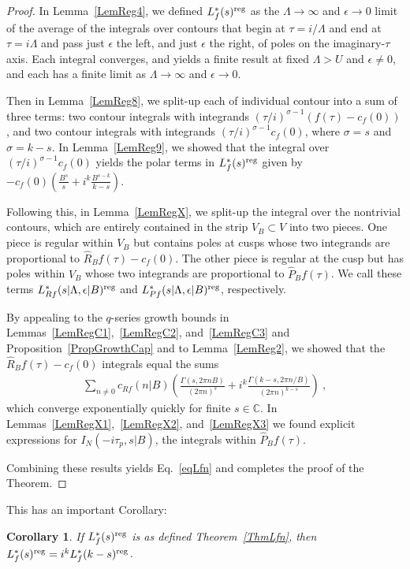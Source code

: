 \documentclass[11pt,a4paper]{article}
\newcommand{\e}{\epsilon}
\newcommand{\G}{\Gamma}
\newcommand{\La}{\Lambda}
\newtheorem{cor}[thm]{Corollary}
\def\C{\mathbb{C}}
\newcommand{\reg}{{\rm reg}}
\newcommand{\PF}{\widehat{P}} 				%
\newcommand{\RF}{\widehat{R}} 				%
\begin{document}
\begin{proof}
In Lemma~\ref{LemReg4}, we defined $L_f^*(s)^\reg$ as the $\La \to \infty$ and $\e \to 0$ limit of the average of the integrals over contours that begin at $\tau = i/\La$ and end at $\tau = i \La$ and pass just $\e$ the left, and just $\e$ the right, of poles on the imaginary-$\tau$ axis. Each integral converges, and yields a finite result at fixed $\La>U$ and $\e\neq 0$, and each has a finite limit as $\La \to \infty$ and $\e \to 0$.

Then in Lemma~\ref{LemReg8}, we split-up each of individual contour into a sum of three terms: two contour integrals with integrands $(\tau/i)^{\sigma-1}(f(\tau) -c_f(0))$, and two contour integrals with integrands $(\tau/i)^{\sigma -1} c_f(0)$, where $\sigma = s$ and $\sigma = k-s$. In Lemma~\ref{LemReg9}, we showed that the integral over $(\tau/i)^{\sigma -1} c_f(0)$ yields the polar terms in $L_f^*(s)^\reg$ given by $-c_f(0)(\tfrac{B^s}{s} + i^k \tfrac{B^{s-k}}{k-s})$. 

Following this, in Lemma~\ref{LemRegX}, we split-up the integral over the nontrivial contours, which are entirely contained in the strip $V_B \subset V$ into two pieces. One piece is regular within $V_B$ but contains poles at cusps whose two integrands are proportional to $\RF_B f(\tau) - c_f(0)$. The other piece is regular at the cusp but has poles within $V_B$ whose two integrands are proportional to  $\PF_B f(\tau)$. We call these terms $L_{Rf}^*(s|\La,\e|B)^\reg$ and $L_{Pf}^*(s|\La,\e|B)^\reg$, respectively.

By appealing to the $q$-series growth bounds in Lemmas~\ref{LemRegC1},~\ref{LemRegC2}, and~\ref{LemRegC3} and Proposition~\ref{PropGrowthCap} and to Lemma~\ref{LemReg2}, we showed that the $\RF_B f(\tau) - c_f(0)$ integrals equal the sums
\begin{align}
\sum_{n \neq 0} c_{Rf}(n|B) \left(\frac{\G(s,2\pi n B)}{(2\pi n)^s}+i^k \frac{\G(k-s,2\pi n /B)}{(2\pi n)^{k-s}}\right)~, 
\end{align}
which converge exponentially quickly for finite $s \in \C$. In Lemmas~\ref{LemRegX1},~\ref{LemRegX2}, and~\ref{LemRegX3} we found explicit expressions for $I_N(-i\tau_p,s|B)$, the integrals within $\PF_B f(\tau)$. 

Combining these results yields Eq.~\eqref{eqLfn} and completes the proof of the Theorem.
\end{proof}

This has an important Corollary:

\begin{cor}
\label{CorLfn1}
If $L_f^*(s)^\reg$ is as defined Theorem~\ref{ThmLfn}, then $L_f^*(s)^\reg= i^k L_f^*(k-s)^\reg$.
\end{cor}
\end{document}
